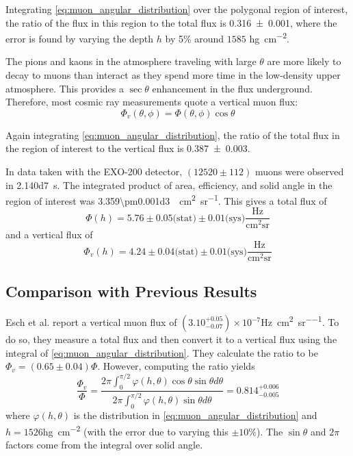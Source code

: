 \documentclass[herrin-thesis.tex]{subfiles}
\begin{document}
Integrating \cref{eq:muon_angular_distribution} over the polygonal region of interest, the ratio of the flux in this region to the total flux is \num{0.316\pm0.001}, where the error is found by varying the depth \(h\) by 5\% around \(1585\) \si{\hecto\g\per\square\cm}.

The pions and kaons in the atmosphere traveling with large \(\theta\) are more likely to decay to muons than interact as they spend more time in the low-density upper atmosphere. This provides a \(\sec\theta\) enhancement in the flux underground. Therefore, most cosmic ray measurements quote a vertical muon flux:
\begin{equation}
\label{eq:muon_vfluxdef}
\Phi_v(\theta, \phi) = \Phi(\theta, \phi)\cos\theta
\end{equation}

Again integrating \cref{eq:muon_angular_distribution}, the ratio of the total flux in the region of interest to the vertical flux is \num{0.387\pm0.003}.

In data taken with the EXO-200 detector, \((12520\pm112)\) muons were observed in \SI{2.140d7}{\second}. The integrated product of area, efficiency, and solid angle in the region of interest was \SI{3.359\pm0.001d3}{\per\square\cm\per\steradian}. This gives a total flux of
\begin{equation}
\label{eq:muon_flux_result}
\Phi(h) = 5.76\pm0.05\text{(stat)}\pm0.01\text{(sys)}\frac{\text{Hz}}{\text{cm}^2\text{sr}}
\end{equation}
and a vertical flux of
\begin{equation}
\label{eq:muon_vflux_result}
\Phi_v(h) = 4.24\pm0.04\text{(stat)}\pm0.01\text{(sys)}\frac{\text{Hz}}{\text{cm}^2\text{sr}}
\end{equation}

\subsection{Comparison with Previous Results}
Esch et al.\cite{Esch:2004zj} report a vertical muon flux of \((3.10^{+0.05}_{-0.07})\times10^{-7}\)\si{\Hz\per\square\cm\per\steradian}. To do so, they measure a total flux and then convert it to a vertical flux using the integral of \cref{eq:muon_angular_distribution}. They calculate the ratio to be \(\Phi_v = (0.65\pm0.04)\Phi\). However, computing the ratio yields 
\begin{equation}
\label{eq:muon_esch_integral}
\frac{\Phi_v}{\Phi} = \frac{2 \pi \int_0^{\pi/2} \varphi(h,\theta)\cos\theta\sin\theta d\theta}{2 \pi \int_0^{\pi/2} \varphi(h,\theta)\sin\theta d\theta} = 0.814^{+0.006}_{-0.005}
\end{equation}
where \(\varphi(h,\theta)\) is the distribution in \cref{eq:muon_angular_distribution} and \(h = 1526\)\si{\hecto\gram\per\square\cm} (with the error due to varying this \(\pm10\%\)). The \(\sin\theta\) and \(2 \pi\) factors come from the integral over solid angle.
\end{document}
